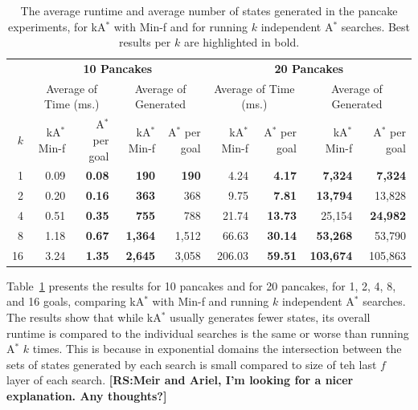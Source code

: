\documentclass{aicom2e}
\newcommand{\astar}{A$^*$}
\newcommand{\kastar}{kA$^*$}
\newcommand{\minf}{Min-f}
\newcommand{\roni}[1]{\textbf{[RS:#1]}}
\begin{document}
\begin{table}[]
	\centering
	\begin{tabular}{r|rr|rr||rr|rr}
		& \multicolumn{4}{c||}{{\bf 10 Pancakes}}                                                           & \multicolumn{4}{c}{{\bf 20 Pancakes}}                                                           \\
		& \multicolumn{2}{c|}{Average of Time (ms.)}   & \multicolumn{2}{c||}{Average of Generated}    & \multicolumn{2}{c|}{Average of Time (ms.)}   & \multicolumn{2}{c}{Average of Generated}    \\\hline
		$k$ & \kastar{} \minf{} & \astar{} per goal & \kastar{} \minf{} & \astar{} per goal & \kastar{} \minf{} & \astar{} per goal & \kastar{} \minf{} & \astar{} per goal \\ \hline
1           & 0.09                  & \textbf{0.08}       & \textbf{190}          & \textbf{190}        & 4.24                  & \textbf{4.17}       & \textbf{7,324}        & \textbf{7,324}      \\
2           & 0.20                  & \textbf{0.16}       & \textbf{363}          & 368                 & 9.75                  & \textbf{7.81}       & \textbf{13,794}       & 13,828              \\
4           & 0.51                  & \textbf{0.35}       & \textbf{755}          & 788                 & 21.74                 & \textbf{13.73}      & 25,154                & \textbf{24,982}     \\
8           & 1.18                  & \textbf{0.67}       & \textbf{1,364}        & 1,512               & 66.63                 & \textbf{30.14}      & \textbf{53,268}       & 53,790              \\
16          & 3.24                  & \textbf{1.35}       & \textbf{2,645}        & 3,058               & 206.03                & \textbf{59.51}      & \textbf{103,674}       & 105,863     
	\end{tabular}
	\caption{The average runtime and average number of states generated in the pancake experiments, for \kastar{} with \minf{} and for running $k$ independent \astar{} searches. Best results per $k$ are highlighted in bold.}
	\label{tab:pancake-minf-k-searches}
\end{table}

Table~\ref{tab:pancake-minf-k-searches} presents the results for 10 pancakes and for 20 pancakes, for 1, 2, 4, 8, and 16 goals, comparing \kastar{} with \minf{} and running $k$ independent \astar{} searches. 
The results show that while \kastar{} usually generates fewer states, its overall runtime is compared to the individual searches is the same or worse than running \astar{} $k$ times. This is because in exponential domains the intersection between the sets of states generated by each search is small compared to size of teh last $f$ layer of each search. \roni{Meir and Ariel, I'm looking for a nicer explanation. Any thoughts?}
\end{document}
